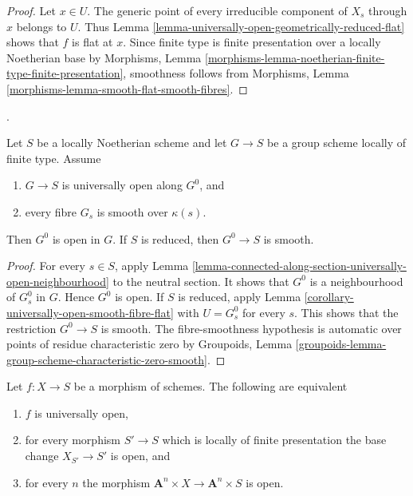 \begin{proof}
Let $x \in U$. The generic point of every irreducible component of $X_s$
through $x$ belongs to $U$. Thus
Lemma \ref{lemma-universally-open-geometrically-reduced-flat} shows that
$f$ is flat at $x$. Since finite type is finite presentation over a locally
Noetherian base by Morphisms, Lemma
\ref{morphisms-lemma-noetherian-finite-type-finite-presentation}, smoothness
follows from Morphisms, Lemma
\ref{morphisms-lemma-smooth-flat-smooth-fibres}.
\end{proof}

\begin{lemma}
\label{corollary-identity-component-open-smooth}
\begin{reference}
\cite[Expos\'e 236, Corollary 1.7, p. 229]{FGA}.
\end{reference}
Let $S$ be a locally Noetherian scheme and let $G \to S$ be a group scheme
locally of finite type. Assume
\begin{enumerate}
\item $G \to S$ is universally open along $G^0$, and
\item every fibre $G_s$ is smooth over $\kappa(s)$.
\end{enumerate}
Then $G^0$ is open in $G$. If $S$ is reduced, then $G^0 \to S$ is smooth.
\end{lemma}

\begin{proof}
For every $s \in S$, apply
Lemma \ref{lemma-connected-along-section-universally-open-neighbourhood} to
the neutral section. It shows that $G^0$ is a neighbourhood of $G_s^0$ in
$G$. Hence $G^0$ is open. If $S$ is reduced, apply
Lemma \ref{corollary-universally-open-smooth-fibre-flat} with
$U=G_s^0$ for every $s$. This shows that the restriction $G^0 \to S$ is
smooth. The fibre-smoothness hypothesis is automatic over points of residue
characteristic zero by Groupoids, Lemma
\ref{groupoids-lemma-group-scheme-characteristic-zero-smooth}.
\end{proof}

\begin{lemma}
\label{lemma-test-universally-open}
Let $f : X \to S$ be a morphism of schemes.
The following are equivalent
\begin{enumerate}
\item $f$ is universally open,
\item for every morphism $S' \to S$ which is locally of finite presentation
the base change $X_{S'} \to S'$ is open, and
\item for every $n$ the morphism
$\mathbf{A}^n \times X \to \mathbf{A}^n \times S$
is open.
\end{enumerate}
\end{lemma}

